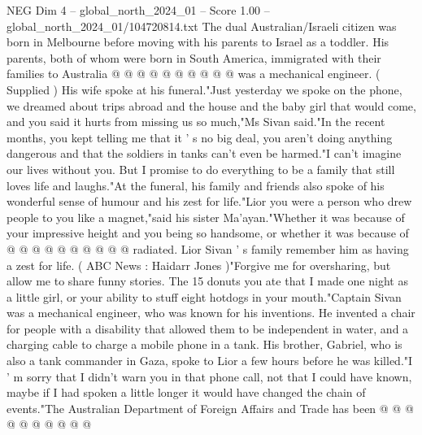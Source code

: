 \begin{textsample}{NEG Dim 4 – global\_north\_2024\_01 – Score 1.00 – global\_north\_2024\_01/104720814.txt}
The dual Australian/Israeli citizen was born in Melbourne before moving with his parents to Israel as a toddler.
His parents, both of whom were born in South America, immigrated with their families to Australia @ @ @ @ @ @ @ @ @ @ was a mechanical engineer. ( Supplied ) His wife spoke at his funeral."Just yesterday we spoke on the phone, we dreamed about trips abroad and the house and the baby girl that would come, and you said it hurts from missing us so much,"Ms Sivan said."In the recent months, you kept telling me that it ' s no big deal, you aren't doing anything dangerous and that the soldiers in tanks can't even be harmed."I can't imagine our lives without you.
But I promise to do everything to be a family that still loves life and laughs."At the funeral, his family and friends also spoke of his wonderful sense of humour and his zest for life."Lior you were a person who drew people to you like a magnet,"said his sister Ma'ayan."Whether it was because of your impressive height and you being so handsome, or whether it was because of @ @ @ @ @ @ @ @ @ @ radiated.
Lior Sivan ' s family remember him as having a zest for life. ( ABC News : Haidarr Jones )"Forgive me for oversharing, but allow me to share funny stories.
The 15 donuts you ate that I made one night as a little girl, or your ability to stuff eight hotdogs in your mouth."Captain Sivan was a mechanical engineer, who was known for his inventions.
He invented a chair for people with a disability that allowed them to be independent in water, and a charging cable to charge a mobile phone in a tank.
His brother, Gabriel, who is also a tank commander in Gaza, spoke to Lior a few hours before he was killed."I ' m sorry that I didn't warn you in that phone call, not that I could have known, maybe if I had spoken a little longer it would have changed the chain of events."The Australian Department of Foreign Affairs and Trade has been @ @ @ @ @ @ @ @ @ @

\end{textsample}
